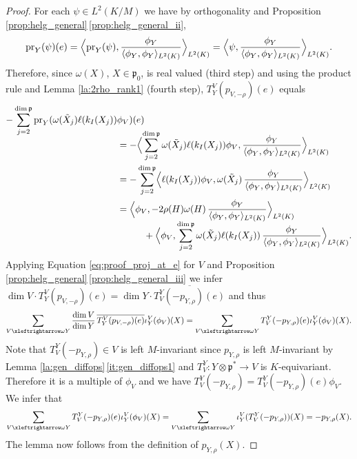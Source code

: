 \documentclass[JEP,XML,SOM,NoFloatCountersInSection,Unicode,published]{cedram}
\theoremstyle{definition}
\newcommand{\lraomega}{\ensuremath{\xleftrightarrow\omega}}
\newcommand{\mf}[1]{\ensuremath{\mathfrak{#1}}}
\newcommand{\on}[1]{\ensuremath{\operatorname{#1}}}
\newcommand{\rhoa}{\ensuremath{\rho}}
\newcommand{\Ik}[1]{\ensuremath{k_I(#1)}}
\begin{document}
\begin{proof}
For each $\psi\in L^2(K/M)$ we have by orthogonality and Proposition \ref{prop:helg_general}\,\eqref{prop:helg_general_ii},
\begin{equation}\label{eq:proof_proj_at_e}
\on{pr}_Y(\psi)(e)=\Bigl\langle\on{pr}_{Y}(\psi),\frac{\phi_Y}{\langle\phi_Y,\phi_Y\rangle_{L^2(K)}}\Bigr\rangle_{L^2(K)}=\Bigl\langle\psi,\frac{\phi_Y}{\langle\phi_Y,\phi_Y\rangle_{L^2(K)}}\Bigr\rangle_{L^2(K)}.
\end{equation}
Therefore, since $\omega(X)$, $X\in\mf p_0$, is real valued (third step) and using the product rule and Lemma \ref{la:2rho_rank1} (fourth step), $T_{Y}^V(p_{V,-\rhoa})(e)$ equals
\begin{align*}
-\sum_{j=2}^{\dim\mf p}\on{pr}_Y(\omega(\tilde X_j)\ell(\Ik{X_j})&\phi_V)(e)\\[-10pt]
&=-\Bigl\langle\sum_{j=2}^{\dim\mf p}\omega(\tilde X_j)\ell(\Ik{X_j})\phi_V,\frac{\phi_Y}{\langle\phi_Y,\phi_Y\rangle_{L^2(K)}}\Bigr\rangle_{L^2(K)}\\
&=-\sum_{j=2}^{\dim\mf p}\Bigl\langle\ell(\Ik{X_j})\phi_V,\omega(\tilde X_j)\,\frac{\phi_Y}{\langle\phi_Y,\phi_Y\rangle_{L^2(K)}}\Bigr\rangle_{L^2(K)}\\
&=\Bigl\langle\phi_V,-2\rhoa(H)\omega(H)\,\frac{\phi_Y}{\langle\phi_Y,\phi_Y\rangle_{L^2(K)}}\Bigr\rangle_{L^2(K)}\\[-5pt]
&\hspace*{1cm}+\Bigl\langle\phi_V,\sum_{j=2}^{\dim\mf p}\omega(\tilde X_j)\ell(\Ik{X_j})\,\frac{\phi_Y}{\langle\phi_Y,\phi_Y\rangle_{L^2(K)}}\Bigr\rangle_{L^2(K)}.
\end{align*}
Applying Equation \eqref{eq:proof_proj_at_e} for $V$ and Proposition \ref{prop:helg_general}\,\eqref{prop:helg_general_iii} we infer $\dim V\cdot T_{Y}^V(p_{V,-\rhoa})(e)=\dim Y\cdot\overline{T_V^Y(-p_{Y,\rhoa})(e)}$ and thus
\[
\sum_{V\lraomega Y}\frac{\dim V}{\dim Y}\,\overline{T_{Y}^V(p_{V,-\rhoa})(e)}\iota_Y^V(\phi_V)(X)=\sum_{V\lraomega Y}T_V^Y(-p_{Y,\rhoa})(e)\iota_Y^V(\phi_V)(X).
\]
Note that $T_V^Y(-p_{Y,\rhoa})\in V$ is left $M$-invariant since $p_{Y,\rhoa}$ is left $M$-invariant by Lemma \ref{la:gen_diffops}\,\eqref{it:gen_diffops1} and $T_V^Y:Y\otimes\mf p^*\to V$ is $K$-equivariant. Therefore it is a multiple of $\phi_V$ and we have $T_V^Y(-p_{Y,\rhoa})=T_V^Y(-p_{Y,\rhoa})(e)\phi_V$.
We infer that
\[
\sum_{V\lraomega Y}T_V^Y(-p_{Y,\rhoa})(e)\iota_Y^V(\phi_V)(X)=\sum_{V\lraomega Y}\iota_Y^V(T_V^Y(-p_{Y,\rhoa}))(X)=-p_{Y,\rhoa}(X).
\]
The lemma now follows from the definition of $p_{Y,\rhoa}(X)$.
\end{proof}
\end{document}
